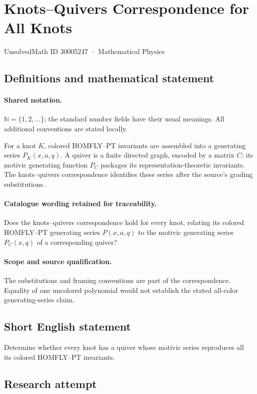 \documentclass[11pt]{article}
\begin{document}
\setcounter{section}{30005246}
\section{Knots–Quivers Correspondence for All Knots}\label{30005247}
{\small UnsolvedMath ID 30005247 · Mathematical Physics}
\subsection{Definitions and mathematical statement}

\paragraph{Shared notation.}$\mathbb N=\{1,2,\ldots\}$; the standard number fields have their usual meanings. All additional conventions are stated locally.


For a knot $K$, colored HOMFLY--PT invariants are assembled into a generating series $P_K(x,a,q)$. A quiver is a finite directed graph, encoded by a matrix $C$; its motivic generating function $P_C$ packages its representation-theoretic invariants. The knots--quivers correspondence identifies these series after the source's grading substitutions.

\paragraph{Catalogue wording retained for traceability.}
Does the knots–quivers correspondence hold for every knot, relating its colored HOMFLY–PT generating series $P(x,a,q)$ to the motivic generating series $P_C(x,q)$ of a corresponding quiver?

\paragraph{Scope and source qualification.}The substitutions and framing conventions are part of the correspondence. Equality of one uncolored polynomial would not establish the stated all-color generating-series claim.
\subsection{Short English statement}
Determine whether every knot has a quiver whose motivic series reproduces all its colored HOMFLY--PT invariants.
\subsection{Research attempt}
\end{document}

